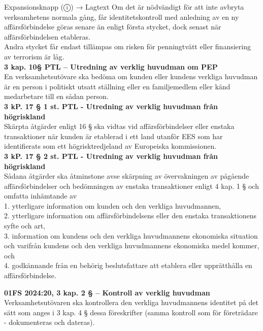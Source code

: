 \documentclass[10pt]{beamer}
\begin{document}
\begin{frame}[label=riskfragor-steg1]
\begin{alertblock}{Expansionsknapp (ⓘ) → Lagtext}
    \tiny Om det är nödvändigt för att inte avbryta verksamhetens normala gång, får identitetskontroll
     med anledning av en ny affärsförbindelse göras senare än enligt första stycket, dock senast när 
     affärsförbindelsen etableras.\\

    \tiny Andra stycket får endast tillämpas om risken för penningtvätt eller finansiering av terrorism är låg.\\[0.1cm]

    \tiny \textbf{ 3 kap. 10§ PTL – Utredning av verklig huvudman om PEP}\\
    \tiny En verksamhetsutövare ska bedöma om kunden eller kundens verkliga huvudman är en person 
     i politiskt utsatt ställning eller en familjemedlem eller känd medarbetare till en sådan person.\\[0.1cm]

    \tiny \textbf{3 kP. 17 § 1 st. PTL - Utredning av verklig huvudman från högriskland}\\
    \tiny Skärpta åtgärder enligt 16 § ska vidtas vid affärsförbindelser eller enstaka 
     transaktioner när kunden är etablerad i ett land utanför EES som har identifierats som ett 
     högrisktredjeland av Europeiska kommissionen.\\[0.1cm]

    \tiny \textbf{3 kP. 17 § 2 st. PTL - Utredning av verklig huvudman från högriskland}\\
    \tiny Sådana åtgärder ska åtminstone avse skärpning av övervakningen av pågående affärsförbindelser och bedömningen av enstaka
     transaktioner enligt 4 kap. 1 § och omfatta inhämtande av\\
    \tiny 1. ytterligare information om kunden och den verkliga huvudmannen,\\
    \tiny 2. ytterligare information om affärsförbindelsens eller den enstaka transaktionens syfte och art,\\
    \tiny 3. information om kundens och den verkliga huvudmannens ekonomiska situation och varifrån kundens
     och den verkliga huvudmannens ekonomiska medel kommer, och\\
    \tiny 4. godkännande från en behörig beslutsfattare att etablera eller upprätthålla en affärsförbindelse.
    \vspace{0.1cm}

    \tiny \textbf{01FS 2024:20, 3 kap. 2 § – Kontroll av verklig huvudman}\\
    \tiny Verksamhetsutövaren ska kontrollera den verkliga huvudmannens identitet på det sätt som anges i 3 kap. 4 § dessa föreskrifter (samma kontroll som för företrädare - dokumenteras och dateras).\\[0.1cm]
    

\end{alertblock}
\end{frame}
\end{document}
